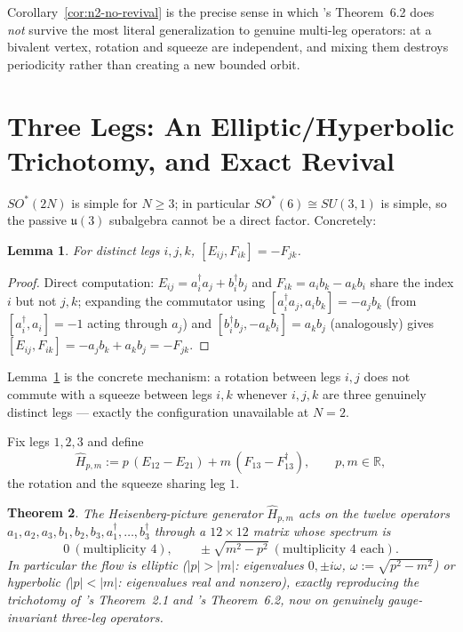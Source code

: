 \documentclass[11pt]{amsart}
\newtheorem{theorem}{Theorem}[section]
\newtheorem{lemma}[theorem]{Lemma}
\theoremstyle{remark}
\begin{document}
Corollary~\ref{cor:n2-no-revival} is the precise sense in which \cite{QuantumRealizations}'s Theorem~6.2 does \emph{not} survive the most literal generalization to genuine multi-leg operators: at a bivalent vertex, rotation and squeeze are independent, and mixing them destroys periodicity rather than creating a new bounded orbit.

\section{Three Legs: An Elliptic/Hyperbolic Trichotomy, and Exact Revival}\label{sec:three-legs}

$SO^*(2N)$ is simple for $N\geq3$; in particular $SO^*(6)\cong SU(3,1)$ is simple, so the passive $\mathfrak u(3)$ subalgebra cannot be a direct factor. Concretely:

\begin{lemma}\label{lem:cross}
For distinct legs $i,j,k$, $[E_{ij},F_{ik}]=-F_{jk}$.
\end{lemma}
\begin{proof}
Direct computation: $E_{ij}=a_i^\dagger a_j+b_i^\dagger b_j$ and $F_{ik}=a_ib_k-a_kb_i$ share the index $i$ but not $j,k$; expanding the commutator using $[a_i^\dagger a_j,a_ib_k]=-a_jb_k$ (from $[a_i^\dagger,a_i]=-1$ acting through $a_j$) and $[b_i^\dagger b_j,-a_kb_i]=a_kb_j$ (analogously) gives $[E_{ij},F_{ik}]=-a_jb_k+a_kb_j=-F_{jk}$.
\end{proof}

Lemma~\ref{lem:cross} is the concrete mechanism: a rotation between legs $i,j$ does not commute with a squeeze between legs $i,k$ whenever $i,j,k$ are three genuinely distinct legs --- exactly the configuration unavailable at $N=2$.

Fix legs $1,2,3$ and define
\[
\hat H_{p,m}:=p\,(E_{12}-E_{21})+m\,(F_{13}-F_{13}^\dagger),\qquad p,m\in\mathbb R,
\]
the rotation and the squeeze sharing leg $1$.

\begin{theorem}\label{thm:trichotomy}
The Heisenberg-picture generator $\hat H_{p,m}$ acts on the twelve operators $a_1,a_2,a_3,b_1,b_2,b_3,a_1^\dagger,\dots,b_3^\dagger$ through a $12\times12$ matrix whose spectrum is
\[
0\ (\text{multiplicity }4),\qquad \pm\sqrt{m^2-p^2}\ (\text{multiplicity }4\text{ each}).
\]
In particular the flow is elliptic ($|p|>|m|$: eigenvalues $0,\pm i\omega$, $\omega:=\sqrt{p^2-m^2}$) or hyperbolic ($|p|<|m|$: eigenvalues real and nonzero), exactly reproducing the trichotomy of \cite{ConicTheorem}'s Theorem~2.1 and \cite{QuantumRealizations}'s Theorem~6.2, now on genuinely gauge-invariant three-leg operators.
\end{theorem}
\end{document}
